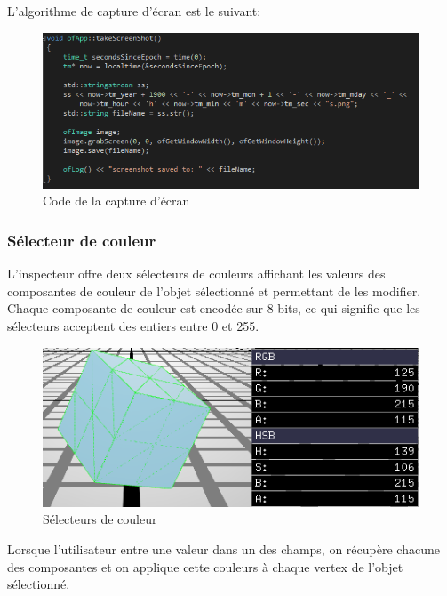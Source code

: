 L'algorithme de capture d'écran est le suivant:
\begin{figure}[H]
    \centering
	\includegraphics[scale=0.5]{fig/screenshotducodequiprenddesscreenshots.PNG}
	\caption{Code de la capture d'écran}
	\label{fig:capture_ecran}
\end{figure}

\subsubsection{Sélecteur de couleur}
\label{ss:selecteur_de_couleur}
L'inspecteur offre deux sélecteurs de couleurs affichant les valeurs des composantes de couleur de l'objet sélectionné et permettant de les modifier.
Chaque composante de couleur est encodée sur 8 bits, ce qui signifie que les sélecteurs acceptent des entiers entre 0 et 255.
\begin{figure}[H]
    \centering
	\includegraphics[scale=0.8]{fig/couleur.PNG}
	\caption{Sélecteurs de couleur}
	\label{fig:color_picker}
\end{figure}
Lorsque l'utilisateur entre une valeur dans un des champs, on récupère chacune des composantes et on applique cette couleurs à chaque vertex de l'objet sélectionné.

